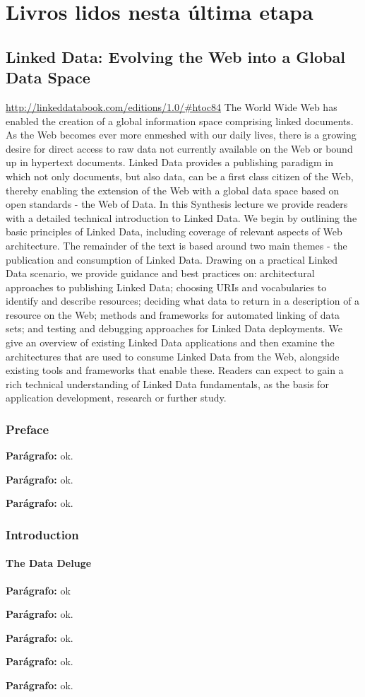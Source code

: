 \documentclass[12pt]{report}
\newcommand{\p}[0]{

\textbf{Parágrafo:}
}
\begin{document}
\part{Livros lidos nesta última etapa}

\chapter{Linked Data: Evolving the Web into a Global Data Space}
\url{http://linkeddatabook.com/editions/1.0/#htoc84}
The World Wide Web has enabled the creation of a global information space comprising linked documents. As the Web becomes ever more enmeshed with our daily lives, there is a growing desire for direct access to raw data not currently available on the Web or bound up in hypertext documents. Linked Data provides a publishing paradigm in which not only documents, but also data, can be a first class citizen of the Web, thereby enabling the extension of the Web with a global data space based on open standards - the Web of Data. In this Synthesis lecture we provide readers with a detailed technical introduction to Linked Data. We begin by outlining the basic principles of Linked Data, including coverage of relevant aspects of Web architecture. The remainder of the text is based around two main themes - the publication and consumption of Linked Data. Drawing on a practical Linked Data scenario, we provide guidance and best practices on: architectural approaches to publishing Linked Data; choosing URIs and vocabularies to identify and describe resources; deciding what data to return in a description of a resource on the Web; methods and frameworks for automated linking of data sets; and testing and debugging approaches for Linked Data deployments. We give an overview of existing Linked Data applications and then examine the architectures that are used to consume Linked Data from the Web, alongside existing tools and frameworks that enable these. Readers can expect to gain a rich technical understanding of Linked Data fundamentals, as the basis for application development, research or further study.
\section{Preface}
\p ok.
\p ok.
\p ok.
\section{Introduction}
\subsection{The Data Deluge}
\p ok
\p ok.
\p ok.
\p ok.
\p ok.
\end{document}
